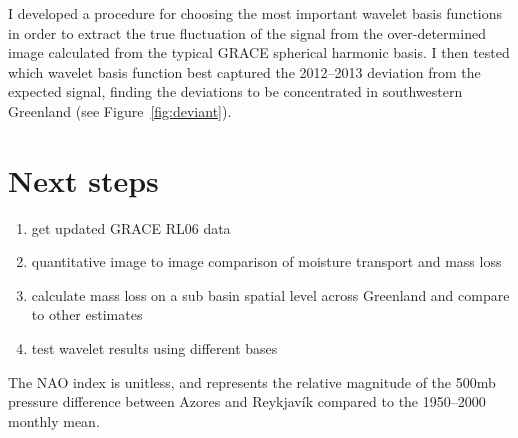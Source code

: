 \documentclass[11pt]{report}
\begin{document}
I developed a procedure for choosing the most important wavelet basis functions in order to extract the true fluctuation of the signal from the over-determined image calculated from the typical GRACE spherical harmonic basis. I then tested which wavelet basis function best captured the 2012--2013 deviation from the expected signal, finding the deviations to be concentrated in southwestern Greenland (see
Figure~\ref{fig:deviant}). 






\section{Next steps}

\begin{enumerate}
\item get updated GRACE RL06 data
\item quantitative image to image comparison of moisture transport and mass loss
\item calculate mass loss on a sub basin spatial level across Greenland and compare to other estimates
\item test wavelet results using different bases
\end{enumerate}

The NAO index is unitless, and represents the relative magnitude of the 500mb pressure difference between Azores and Reykjav\'ik compared to the 1950--2000 monthly mean.





\small
\renewcommand{\bibsep}{0em}

\renewcommand{\bibname}{References}


\end{document}
